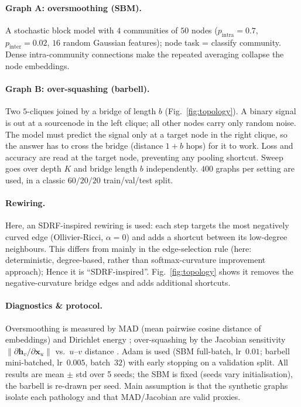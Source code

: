 \documentclass[inlineanswers]{exam2024}
\begin{document}
\paragraph{Graph A: oversmoothing (SBM).}
A stochastic block model with $4$ communities of $50$ nodes ($p_{\text{intra}}{=}0.7$,
$p_{\text{inter}}{=}0.02$, $16$ random Gaussian features); node task = classify community. Dense intra-community connections make the repeated averaging collapse the node embeddings.

\paragraph{Graph B: over-squashing (barbell).}
Two $5$-cliques joined by a bridge of length $b$ (Fig.~\ref{fig:topology}). A binary signal is out at a sourcenode in the left clique; all other nodes carry only random noise. The model must predict the signal only at a target node in
the right clique, so the answer has to cross the bridge (distance $1{+}b$ hops) for it to work. Loss and accuracy are read at the target node, preventing any pooling shortcut. Sweep goes over depth $K$ and bridge length $b$ independently. $400$ graphs per setting are used, in a classic $60/20/20$ train/val/test split.

\paragraph{Rewiring.}
Here, an SDRF-inspired rewiring is used: each step targets the most negatively curved edge (Ollivier-Ricci, $\alpha{=}0$) and adds a shortcut between its low-degree neighbours. This differs from \cite{topping2022} mainly in the edge-selection rule (here: deterministic, degree-based, rather than softmax-curvature improvement approach); Hence it is ``SDRF-inspired''. Fig.~\ref{fig:topology} shows it removes the negative-curvature bridge edges and adds additional shortcuts.

\paragraph{Diagnostics \& protocol.} 
Oversmoothing is measured by MAD (mean pairwise cosine distance of embeddings) and Dirichlet energy \cite{li2018deeper,rusch2023survey}; over-squashing by the Jacobian sensitivity $\lVert\partial \bm h_v/\partial \bm x_u\rVert$ vs.\ $u$–$v$ distance \cite{topping2022,digiovanni2023}. Adam is used (SBM full-batch, lr~$0.01$; barbell mini-batched, lr~$0.005$, batch~$32$) with early stopping on a validation split. All results are mean $\pm$ std over 5 seeds; the SBM is fixed (seeds vary initialisation), the barbell is re-drawn per seed. Main assumption is that the synthetic graphs isolate each pathology and that MAD/Jacobian are valid proxies.
\end{document}
